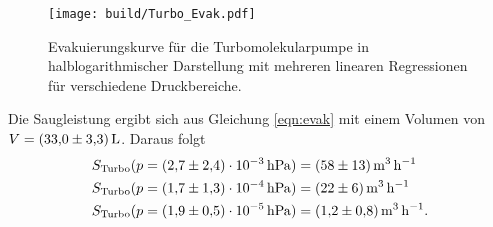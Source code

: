 \begin{figure}[H]
    \centering
    \texttt{[image: build/Turbo\_Evak.pdf]}
    \caption{Evakuierungskurve für die Turbomolekularpumpe in halblogarithmischer Darstellung mit mehreren linearen Regressionen für verschiedene Druckbereiche.}
    \label{fig:turbo_evak}
\end{figure}
\noindent
Die Saugleistung ergibt sich aus Gleichung \ref{eqn:evak} mit einem Volumen von $V=\SI{33 \pm 3.3}{\litre}$.
Daraus folgt
\begin{align*}
  S_\text{Turbo}(p=\SI{2.7\pm 2.4 e-3}{\hecto\pascal})&=\SI[per-mode=reciprocal]{58 \pm 13}{\cubic\metre\per\hour}\\
  S_\text{Turbo}(p=\SI{1.7\pm 1.3 e-4}{\hecto\pascal})&=\SI[per-mode=reciprocal]{22\pm 6}{\cubic\metre\per\hour}\\
  S_\text{Turbo}(p=\SI{1.9\pm 0.5 e-5}{\hecto\pascal})&=\SI[per-mode=reciprocal]{1.2\pm 0.8}{\cubic\metre\per\hour}.
\end{align*}
